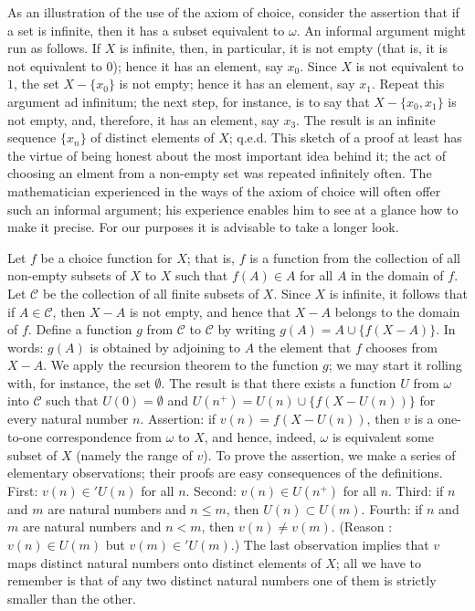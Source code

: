 As an illustration of the use of the axiom of choice, consider the assertion that if a set is infinite, then it has a subset equivalent to $\omega$. An informal argument might run as follows. If $X$ is infinite, then, in particular, it is not empty (that is, it is not equivalent to $0$); hence it has an element, say $x_{0}$. Since $X$ is not equivalent to $1$, the set $X - \{ x_{0} \}$ is not empty; hence it has an element, say $x_{1}$. Repeat this argument ad infinitum; the next step, for instance, is to say that $X - \{ x_{0}, x_{1} \}$ is not empty, and, therefore, it has an element, say $x_{3}$. The result is an infinite sequence $\{ x_{n} \}$ of distinct elements of $X$; q.e.d. This sketch of a proof at least has the virtue of being honest about the most important idea behind it; the act of choosing an elment from a non-empty set was repeated infinitely often. The mathematician experienced in the ways of the axiom of choice will often offer such an informal argument; his experience enables him to see at a glance how to make it precise. For our purposes it is advisable to take a longer look.

Let $f$ be a choice function for $X$; that is, $f$ is a function from the collection of all non-empty subsets of $X$ to $X$ such that $f(A) \in A$ for all $A$ in the domain of $f$. Let $\mathcal{C}$ be the collection of all finite subsets of $X$. Since $X$ is infinite, it follows that if $A \in \mathcal{C}$, then $X - A$ is not empty, and hence that $X - A$ belongs to the domain of $f$. Define a function $g$ from $\mathcal{C}$ to $\mathcal{C}$ by writing $g(A) = A \cup \{ f(X - A) \}$. In words: $g(A)$ is obtained by adjoining to $A$ the element that $f$ chooses from $X - A$. We apply the recursion theorem to the function $g$; we may start it rolling with, for instance, the set $ \emptyset $. The result is that there exists a function $U$ from $\omega$ into $\mathcal{C}$ such that $U(0) = \emptyset$ and $U(n^{+}) = U(n) \cup \{ f(X - U(n)) \}$ for every natural number $n$. Assertion: if $v(n) = f(X - U(n))$, then $v$ is a one-to-one correspondence from $\omega$ to $X$, and hence, indeed, $\omega$ is equivalent some subset of $X$ (namely the range of $v$). To prove the assertion, we make a series  of  elementary observations; their proofs are easy consequences of the definitions. First: $v(n) \in ' U(n)$ for all $n$. Second: $v(n) \in U(n^{+})$ for all $n$. Third: if $n$ and $m$ are natural numbers and $n \le m$, then $U(n) \subset U(m)$. Fourth: if $n$ and $m$ are natural numbers and $n < m$, then $v(n) \neq v(m)$.  (Reason : $v(n) \in U(m)$ but $v(m) \in ' U(m)$.) The last observation implies that $v$ maps distinct natural numbers onto distinct elements of $X$; all we have to remember is that of any two distinct natural numbers one of them is strictly smaller than the other. 

